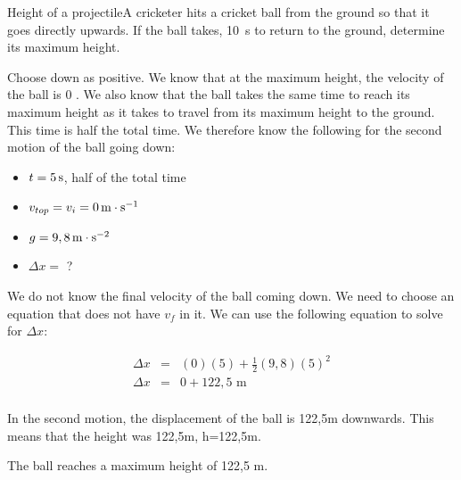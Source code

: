 \begin{wex}{Height of a projectile}{A cricketer hits a cricket ball from the ground so that it goes directly upwards. If the ball takes, 10~s to return to the ground, determine its maximum height.}
{Choose down as positive. We know that at the maximum height, the velocity of the ball is 0 \ms. We also know that the ball takes the same time to reach its maximum height as it takes to travel from its maximum height to the ground. This time is half the total time. We therefore know the following for the second motion of the ball going down:
\begin{itemize}
\item{$t=5\,\mathrm{s}$, half of the total time}
\item{$v_{top}=v_i=0\,\mathrm{m \cdot s^{-1}}$}
\item{$g=9,8\,\mathrm{m \cdot s^{-2}}$}
\item{$\Delta x=$ ?}
\end{itemize}

We do not know the final velocity of the ball coming down. We need to choose an equation that does not have $v_f$ in it. We can use the following equation to solve for $\Delta x$:

\begin{eqnarray*}
\Delta x &=& (0)(5) + \frac{1}{2}(9,8)(5)^2\\
\Delta x &=& 0 + 122,5\text{ m}\\
\end{eqnarray*}

In the second motion, the displacement of the ball is 122,5m downwards. This means that the height was 122,5m, h=122,5m.

The ball reaches a maximum height of 122,5 m.}
\end{wex}

